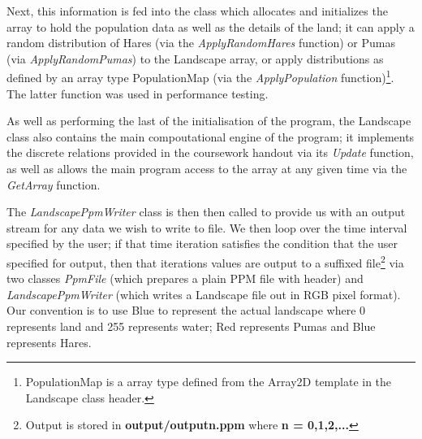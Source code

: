 Next, this information is fed into the  class which allocates and initializes the array to hold the population data as well as the details of the land; it can apply a random distribution of Hares (via the \textit{ApplyRandomHares} function) or Pumas (via \textit{ApplyRandomPumas}) to the Landscape array, or apply distributions as defined by an array type PopulationMap (via the \textit{ApplyPopulation} function)\footnote{PopulationMap is a array type defined from the Array2D template in the Landscape class header.}. The latter function was used in performance testing.

As well as performing the last of the initialisation of the program, the Landscape class also contains the main compoutational engine of the program; it implements the discrete relations provided in the coursework handout via its \textit{Update} function, as well as allows the main program access to the array at any given time via the \textit{GetArray} function.

The \textit{LandscapePpmWriter} class is then then called to provide us with an output stream for any data we wish to write to file. We then loop over the time interval specified by the user; if that time iteration satisfies the condition that the user specified for output, then that iterations values are output to a suffixed file\footnote{Output is stored in \textbf{output/outputn.ppm} where \textbf{n = 0,1,2,...}} via two classes \textit{PpmFile} (which prepares a plain PPM file with header) and \textit{LandscapePpmWriter} (which writes a Landscape file out in RGB pixel format). Our convention is to use Blue to represent the actual landscape where 0 represents land and 255 represents water; Red represents Pumas and Blue represents Hares.

